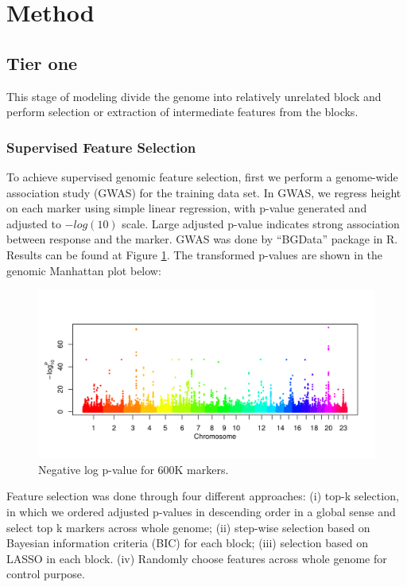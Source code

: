 \documentclass[acmtog, authorversion]{acmart}
\begin{document}
\section{Method}
\subsection{Tier one}
This stage of modeling divide the genome into relatively unrelated block and perform selection or extraction of intermediate features from the blocks.
\subsubsection{Supervised Feature Selection}
To achieve supervised genomic feature selection, first we perform a genome-wide association study (GWAS) for the training data set. In GWAS, we regress height on each marker using simple linear regression, with p-value generated and adjusted to $-log(10)$ scale. Large adjusted p-value indicates strong association between response and the marker. GWAS was done by “BGData” package in R. Results can be found at Figure \ref{gwas}. The transformed p-values are shown in the genomic Manhattan plot below:
\begin{figure}[h]
  \centering
  \includegraphics[width=3.5 in, trim=0 0 0in 0]{img/gwas_height}
  \caption{Negative log p-value for 600K markers.}
  \label{gwas}
\end{figure}

Feature selection was done through four different approaches: (i) top-k selection, in which we ordered adjusted p-values in descending order in a global sense and select top k markers across whole genome; (ii) step-wise selection based on Bayesian information criteria (BIC) for each block; (iii) selection based on LASSO in each block. (iv) Randomly choose features across whole genome for control purpose. 
\end{document}
